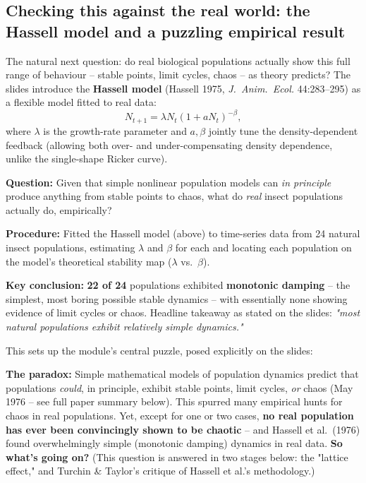 \documentclass[11pt,a4paper]{article}
\begin{document}
\subsection{Checking this against the real world: the Hassell model and a puzzling empirical result}
The natural next question: do real biological populations actually show this full range of behaviour -- stable points, limit cycles, chaos -- as theory predicts? The slides introduce the \textbf{Hassell model} (Hassell 1975, \emph{J.\ Anim.\ Ecol.} 44:283--295) as a flexible model fitted to real data:
\[
N_{t+1} = \lambda N_t (1+aN_t)^{-\beta},
\]
where $\lambda$ is the growth-rate parameter and $a,\beta$ jointly tune the density-dependent feedback (allowing both over- and under-compensating density dependence, unlike the single-shape Ricker curve).

\begin{papbox}[title={Paper Summary: Hassell, Lawton \& May (1976), \textit{J.\ Anim.\ Ecol.} 45:471--486 -- fitting the Hassell model to real insect populations}]
\textbf{Question:} Given that simple nonlinear population models can \emph{in principle} produce anything from stable points to chaos, what do \emph{real} insect populations actually do, empirically?

\textbf{Procedure:} Fitted the Hassell model (above) to time-series data from 24 natural insect populations, estimating $\lambda$ and $\beta$ for each and locating each population on the model's theoretical stability map ($\lambda$ vs.\ $\beta$).

\textbf{Key conclusion:} \textbf{22 of 24} populations exhibited \textbf{monotonic damping} -- the simplest, most boring possible stable dynamics -- with essentially none showing evidence of limit cycles or chaos. Headline takeaway as stated on the slides: \emph{"most natural populations exhibit relatively simple dynamics."}
\end{papbox}

This sets up the module's central puzzle, posed explicitly on the slides:
\begin{exambox}
\textbf{The paradox:} Simple mathematical models of population dynamics predict that populations \emph{could}, in principle, exhibit stable points, limit cycles, \emph{or} chaos (May 1976 -- see full paper summary below). This spurred many empirical hunts for chaos in real populations. Yet, except for one or two cases, \textbf{no real population has ever been convincingly shown to be chaotic} -- and Hassell et al.\ (1976) found overwhelmingly simple (monotonic damping) dynamics in real data. \textbf{So what's going on?} (This question is answered in two stages below: the "lattice effect," and Turchin \& Taylor's critique of Hassell et al.'s methodology.)
\end{exambox}
\end{document}

